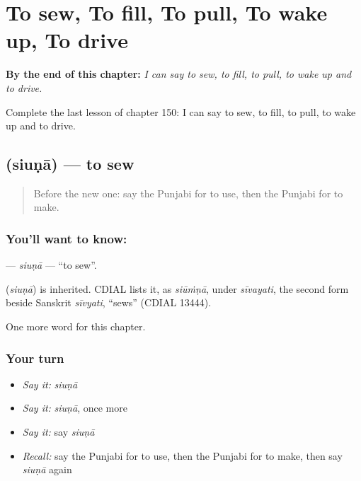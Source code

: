 
\chapter{To sew, To fill, To pull, To wake up, To drive}
\label{ch:pa-to-sew-to-fill-to-pull-to-wake-up-to-drive}

\begin{chapteropening}
\textbf{By the end of this chapter:} \emph{I can say to sew, to fill, to pull, to wake up and to drive.}

Complete the last lesson of chapter 150: I can say to sew, to fill, to pull, to wake up and to drive.
\end{chapteropening}

\section[\texorpdfstring{\pa{ਸਿਉਣਾ} (siuṇā)}{ਸਿਉਣਾ (siuṇā)}]{ (siuṇā) — to sew}

\label{lesson:PA-C150-siuna}



\begin{quote}
Before the new one: say the Punjabi for to use, then the Punjabi for to make.
\end{quote}

\subsection*{You'll want to know: }
\textbf{} — \emph{siuṇā} — \textquotedblleft{}to sew\textquotedblright{}.

\begin{cousinweb}
\textbf{} (\emph{siuṇā}) is inherited. CDIAL lists it, as \emph{siūṁṇā}, under \emph{sīvayati}, the second form beside Sanskrit \emph{sīvyati}, \textquotedblleft{}sews\textquotedblright{} (CDIAL 13444).
\end{cousinweb}

\begin{grammarlens}[title={What you've built}]
One more word for this chapter.
\end{grammarlens}

\subsection*{Your turn}
\begin{itemize}
\raggedright
  \item \emph{Say it:} \emph{siuṇā}
  \item \emph{Say it:} \emph{siuṇā}, once more
  \item \emph{Say it:} say \emph{siuṇā}
  \item \emph{Recall:} say the Punjabi for to use, then the Punjabi for to make, then say \emph{siuṇā} again
\end{itemize}

